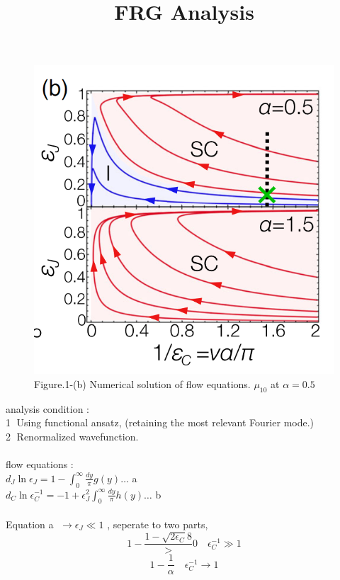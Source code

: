 \documentclass{article}
\title{FRG Analysis}
\begin{document}
\maketitle
\begin{figure}[!h]
    \centerline{\includegraphics[width=\columnwidth]{Phy129087001_4.png}}
    \caption{Figure.1-(b) Numerical solution of flow equations. $\mu_{10}$ at $\alpha=0.5$}
    \label{figure_1} 
\end{figure}
analysis condition : \\
\textcircled{1} Using functional ansatz, (retaining the most relevant Fourier mode.)\\
\textcircled{2} Renormalized wavefunction.\\
\\
flow equations : \\
 $d_J \ln \epsilon_J = 1- \int^{\infty}_{0}\frac{dy}{\pi}g(y) \dots $ \textcircled{a}\\
 $d_C \ln \epsilon^{-1}_C = -1 + \epsilon^{2}_J\int^{\infty}_{0}\frac{dy}{\pi}h(y) \dots$ \textcircled{b}\\
\\
Equation \textcircled{a} $\rightarrow \epsilon_J \ll 1$ , seperate to two parts,\\
\begin{equation}
    1-\frac{1-\sqrt{2\epsilon_C}{8}} >0 \quad \epsilon^{-1}_C \gg 1
\end{equation}
\begin{equation}
    1-\frac{1}{\alpha} \quad \epsilon^{-1}_C \rightarrow 1
\end{equation}
\end{document}
